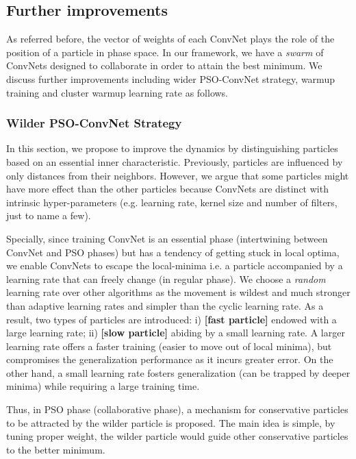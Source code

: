 \documentclass{ieeeaccess}
\begin{document}
\subsection{Further improvements}
As referred before, the vector of weights of each ConvNet plays the role of the position of a particle in phase space. In our framework, we have a \emph{swarm} of ConvNets designed to collaborate in order to attain the best minimum. We discuss further improvements including wider PSO-ConvNet strategy, warmup training and cluster warmup learning rate as follows.
\subsubsection{Wilder PSO-ConvNet Strategy}
\label{sec:randomlrs}
In this section, we propose to improve the dynamics by distinguishing particles based on an essential inner characteristic. Previously, particles are influenced by only distances from their neighbors. However, we argue that some particles might have more effect than the other particles because ConvNets are distinct with intrinsic hyper-parameters (e.g. learning rate, kernel size and number of filters, just to name a few).

Specially, since training ConvNet is an essential phase (intertwining between ConvNet and PSO phases) but has a tendency of getting stuck in local optima, we enable ConvNets to escape the local-minima i.e. a particle accompanied by a learning rate that can freely change (in regular phase). We choose a \textit{random} learning rate over other algorithms as the movement is wildest and much stronger than adaptive learning rates and simpler than the cyclic learning rate. As a result, two types of particles are introduced: i) \textbf{[fast particle]} endowed with a large learning rate; ii) \textbf{[slow particle]} abiding by a small learning rate. A larger learning rate offers a faster training (easier to move out of local minima), but compromises the generalization performance as it incurs greater error. On the other hand, a small learning rate fosters generalization (can be trapped by deeper minima) while requiring a large training time.

Thus, in PSO phase (collaborative phase), a mechanism for conservative particles to be attracted by the wilder particle is proposed. The main idea is simple, by tuning proper weight, the wilder particle would guide other conservative particles to the better minimum.
\end{document}

